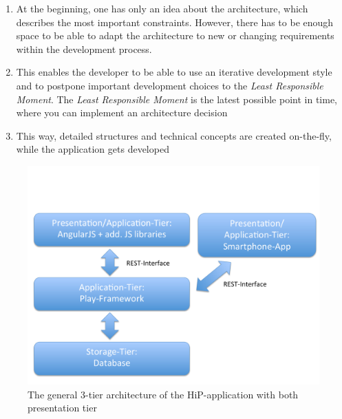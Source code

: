 \begin{enumerate}
	\item At the beginning, one has only an idea about the architecture, which describes the most important constraints. However, there has to be enough space to be able to adapt the architecture to new or changing requirements within the development process.
	\item This enables the developer to be able to use an iterative development style and to postpone important development choices to the \textit{Least Responsible Moment}. The \textit{Least Responsible Moment} is the latest possible point in time, where you can implement an architecture decision 
	\item This way, detailed structures and technical concepts are created on-the-fly, while the application gets developed
\end{enumerate}

\begin{figure}[th]
\centerline{\includegraphics[width=1\textwidth]{gfx/architecture}}
\caption{The general 3-tier architecture of the HiP-application with both presentation tier}
\label{hip:architecture}
\end{figure}


